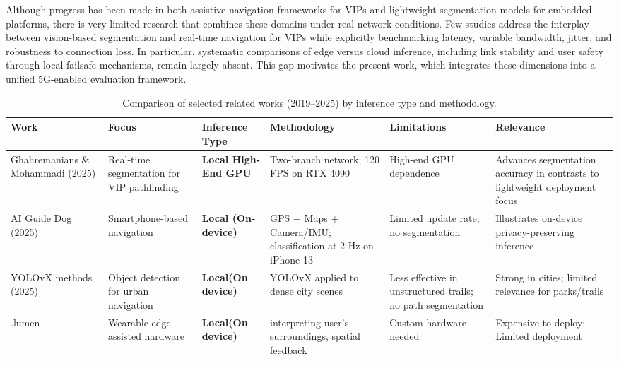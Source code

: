 \documentclass{ieeeaccess}
\begin{document}
Although progress has been made in both assistive navigation frameworks for VIPs and lightweight segmentation models for embedded platforms, there is very limited research that combines these domains under real network conditions. Few studies address the interplay between vision-based segmentation and real-time navigation for VIPs while explicitly benchmarking latency, variable bandwidth, jitter, and robustness to connection loss. In particular, systematic comparisons of edge versus cloud inference, including link stability and user safety through local failsafe mechanisms, remain largely absent. This gap motivates the present work, which integrates these dimensions into a unified 5G-enabled evaluation framework.

\begin{table}[t]
\centering
\caption{Comparison of selected related works (2019--2025) by inference type and methodology.}
\label{tab:relatedworks}
\begin{tabular}{|p{2.4cm}|p{2.4cm}|p{2.0cm}|p{3.2cm}|p{2.5cm}|p{3.0cm}|}
\hline
\textbf{Work} & \textbf{Focus} & \textbf{Inference Type} & \textbf{Methodology} & \textbf{Limitations} & \textbf{Relevance} \\
\hline
\cite{pathfinding2025} Ghahremanians \& Mohammadi (2025) & Real-time segmentation for VIP pathfinding & \textbf{Local High-End GPU} & Two-branch network; 120 FPS on RTX 4090 & High-end GPU dependence & Advances segmentation accuracy in contrasts to lightweight deployment focus \\
\hline
\cite{chen2025aigd} AI Guide Dog (2025) & Smartphone-based navigation & \textbf{Local (On-device)} & GPS + Maps + Camera/IMU; classification at 2 Hz on iPhone 13 & Limited update rate; no segmentation & Illustrates on-device privacy-preserving inference \\
\hline
\cite{khan2025enhancing,11156811} YOLOvX methods (2025) & Object detection for urban navigation & \textbf{Local(On device)} & YOLOvX applied to dense city scenes & Less effective in unstructured trails; no path segmentation & Strong in cities; limited relevance for parks/trails \\
\hline
\cite{dotlumen2025}{.lumen} & Wearable edge-assisted hardware & \textbf{Local(On device)} & interpreting user’s surroundings, spatial feedback & Custom hardware needed & Expensive to deploy:  Limited deployment \\
\hline


\end{tabular}
\end{table}
\end{document}
